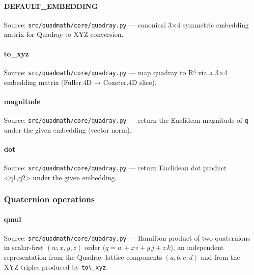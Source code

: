 \documentclass[
  10pt,
]{article}
\newcommand{\passthrough}[1]{#1}
\renewcommand{\texttt}[1]{%
    \colorbox{codebg}{\color{codefg}\ttfamily #1}%
}
\begin{document}
\paragraph{\texorpdfstring{\texttt{DEFAULT\_EMBEDDING}}{DEFAULT\_EMBEDDING}}\label{code:DEFAULT_EMBEDDING}

Source: \passthrough{\lstinline!src/quadmath/core/quadray.py!} ---
canonical 3×4 symmetric embedding matrix for Quadray to XYZ conversion.

\paragraph{\texorpdfstring{\texttt{to\_xyz}}{to\_xyz}}\label{code:to_xyz}

Source: \passthrough{\lstinline!src/quadmath/core/quadray.py!} --- map
quadray to R³ via a 3×4 embedding matrix (Fuller.4D → Coxeter.4D slice).

\paragraph{\texorpdfstring{\texttt{magnitude}}{magnitude}}\label{code:magnitude}

Source: \passthrough{\lstinline!src/quadmath/core/quadray.py!} ---
return the Euclidean magnitude of \passthrough{\lstinline!q!} under the
given embedding (vector norm).

\paragraph{\texorpdfstring{\texttt{dot}}{dot}}\label{code:dot}

Source: \passthrough{\lstinline!src/quadmath/core/quadray.py!} ---
return Euclidean dot product \textless q1,q2\textgreater{} under the
given embedding.

\subsubsection{Quaternion operations}\label{code:quaternion_operations}

\paragraph{\texorpdfstring{\texttt{qmul}}{qmul}}\label{code:qmul}

Source: \passthrough{\lstinline!src/quadmath/core/quadray.py!} ---
Hamilton product of two quaternions in scalar-first \((w, x, y, z)\)
order (\(q = w + x\,i + y\,j + z\,k\)), an independent representation
from the Quadray lattice components \((a, b, c, d)\) and from the XYZ
triples produced by \passthrough{\lstinline!to\_xyz!}.
\end{document}

